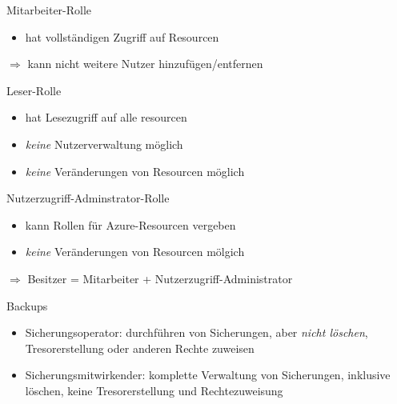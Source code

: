 \begin{flashcard}[Definition]{Mitarbeiter-Rolle}
    \begin{itemize}
        \item hat vollständigen Zugriff auf Resourcen
    \end{itemize}
    $\Rightarrow$ kann nicht weitere Nutzer hinzufügen/entfernen
\end{flashcard}

\begin{flashcard}[Definition]{Leser-Rolle}
    \begin{itemize}
        \item hat Lesezugriff auf alle resourcen
        \item \emph{keine} Nutzerverwaltung möglich
        \item \emph{keine} Veränderungen von Resourcen möglich
    \end{itemize}
\end{flashcard}

\begin{flashcard}[Definition]{Nutzerzugriff-Adminstrator-Rolle}
    \begin{itemize}
        \item kann Rollen für Azure-Resourcen vergeben
        \item \emph{keine} Veränderungen von Resourcen mölgich
    \end{itemize}
    $\Rightarrow$ Besitzer = Mitarbeiter + Nutzerzugriff-Administrator
\end{flashcard}

\begin{flashcard}[Definition]{Backups}
    \begin{itemize}
        \item Sicherungsoperator: durchführen von Sicherungen, aber \emph{nicht löschen}, Tresorerstellung oder anderen Rechte zuweisen
        \item Sicherungsmitwirkender: komplette Verwaltung von Sicherungen, inklusive löschen, keine Tresorerstellung und Rechtezuweisung
    \end{itemize}
\end{flashcard}

